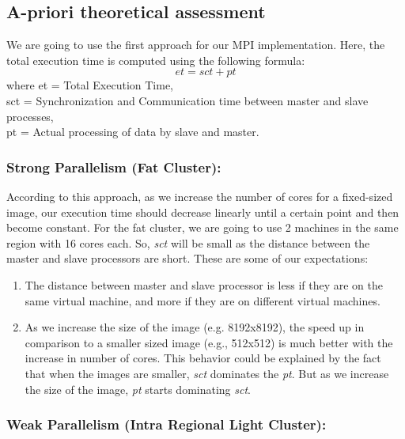 \documentclass{article}
\begin{document}
\subsection{A-priori theoretical assessment}

We are going to use the first approach for our MPI implementation. Here, the total execution time is computed using the following formula:
\begin{equation*}
        et = sct + pt
\end{equation*}
        where et = Total Execution Time,\\
        sct = Synchronization and Communication time between master and slave processes,\\
        pt = Actual processing of data by slave and master.

\subsubsection{Strong Parallelism (Fat Cluster):}

According to this approach, as we increase the number of cores for a fixed-sized image, our execution time should decrease linearly until a certain point and then become constant. For the fat cluster, we are going to use 2 machines in the same region with 16 cores each. So, \textit{sct} will be small as the distance between the master and slave processors are short. These are some of our expectations:

\begin{enumerate}
    \item The distance between master and slave processor is less if they are on the same virtual machine, and more if they are on different virtual machines. 
    \item As we increase the size of the image (e.g. 8192x8192), the speed up in comparison to a smaller sized image (e.g., 512x512) is much better with the increase in number of cores. This behavior could be explained by the fact that when the images are smaller, \textit{sct} dominates the \textit{pt}. But as we increase the size of the image, \textit{pt} starts dominating \textit{sct}.

\end{enumerate}

\subsubsection{Weak Parallelism (Intra Regional Light Cluster):}
\end{document}

